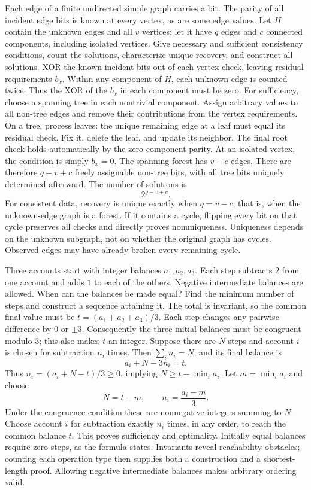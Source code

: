 Each edge of a finite undirected simple graph carries a bit. The parity of all incident edge bits is known at every vertex, as are some edge values. Let $H$ contain the unknown edges and all $v$ vertices; let it have $q$ edges and $c$ connected components, including isolated vertices. Give necessary and sufficient consistency conditions, count the solutions, characterize unique recovery, and construct all solutions.
\solution XOR the known incident bits out of each vertex check, leaving residual requirements $b_x$. Within any component of $H$, each unknown edge is counted twice. Thus the XOR of the $b_x$ in each component must be zero.
For sufficiency, choose a spanning tree in each nontrivial component. Assign arbitrary values to all non-tree edges and remove their contributions from the vertex requirements. On a tree, process leaves: the unique remaining edge at a leaf must equal its residual check. Fix it, delete the leaf, and update its neighbor. The final root check holds automatically by the zero component parity. At an isolated vertex, the condition is simply $b_x=0$.
The spanning forest has $v-c$ edges. There are therefore $q-v+c$ freely assignable non-tree bits, with all tree bits uniquely determined afterward. The number of solutions is
\[
 \boxed{2^{q-v+c}}.
\]
For consistent data, recovery is unique exactly when $q=v-c$, that is, when the unknown-edge graph is a forest. If it contains a cycle, flipping every bit on that cycle preserves all checks and directly proves nonuniqueness.
\insight Uniqueness depends on the unknown subgraph, not on whether the original graph has cycles. Observed edges may have already broken every remaining cycle.

Three accounts start with integer balances $a_1,a_2,a_3$. Each step subtracts $2$ from one account and adds $1$ to each of the others. Negative intermediate balances are allowed. When can the balances be made equal? Find the minimum number of steps and construct a sequence attaining it.
\solution The total is invariant, so the common final value must be $t=(a_1+a_2+a_3)/3$. Each step changes any pairwise difference by $0$ or $\pm3$. Consequently the three initial balances must be congruent modulo $3$; this also makes $t$ an integer.
Suppose there are $N$ steps and account $i$ is chosen for subtraction $n_i$ times. Then $\sum_i n_i=N$, and its final balance is
\[
 a_i+N-3n_i=t.
\]
Thus $n_i=(a_i+N-t)/3\ge0$, implying $N\ge t-\min_i a_i$. Let $m=\min_i a_i$ and choose
\[
 N=t-m,\qquad n_i=\frac{a_i-m}{3}.
\]
Under the congruence condition these are nonnegative integers summing to $N$. Choose account $i$ for subtraction exactly $n_i$ times, in any order, to reach the common balance $t$. This proves sufficiency and optimality. Initially equal balances require zero steps, as the formula states.
\insight Invariants reveal reachability obstacles; counting each operation type then supplies both a construction and a shortest-length proof. Allowing negative intermediate balances makes arbitrary ordering valid.

